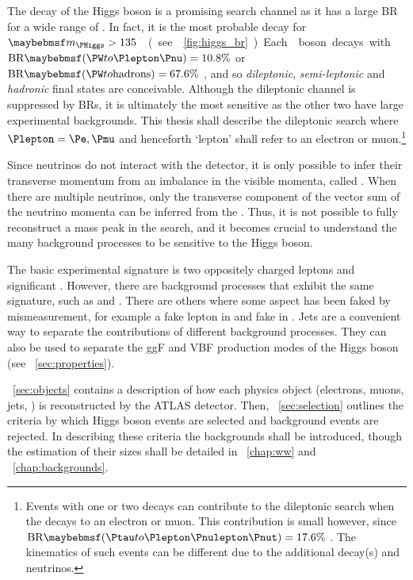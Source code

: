 
The \WW decay of the Higgs boson is a promising search channel as it has a large \ac{BR} 
for a wide range of \mH. In fact, it is the most probable decay for \unit{$\mH > 
135$}{\GeV} (see \Figure~\ref{fig:higgs_br}). Each \PW boson decays with 
$\text{BR}\parenths{\HepProcess{\PW\HepTo\Plepton\Pnu}} = 10.8\%$ 
or $\text{BR}\parenths{\HepProcess{\PW\HepTo \text{hadrons}}} = 67.6\%$ \cite{PDG:2012}, 
and so \textit{dileptonic}, \textit{semi-leptonic} and \textit{hadronic} final states are 
conceivable. Although the dileptonic channel is suppressed by \acp{BR}, it is ultimately 
the most sensitive as the other two have large experimental backgrounds. This thesis shall 
describe the dileptonic search \HWWlvlv where $\Plepton = \Pe, \Pmu$ and henceforth 
`lepton' shall refer to an electron or muon.\footnote{
	Events with one or two \HepProcess{\PW\HepTo\Ptau\Pnu} decays can 
	contribute to the dileptonic search when the \Ptau decays to an electron or muon. This 
	contribution is small however, since
	$\text{BR}\parenths{\HepProcess{\Ptau\HepTo\Plepton\Pnulepton\Pnut}} = 17.6\%$ 
	\cite{PDG:2012}. The kinematics of such events can be different due to the additional 
	decay(s) and neutrinos.
}

Since neutrinos do not interact with the detector, it is only possible to infer their 
transverse momentum from an imbalance in the visible momenta, called \met. When there are 
multiple neutrinos, only the transverse component of the vector sum of the neutrino 
momenta can be inferred from the \met. Thus, it is not possible to fully reconstruct a 
mass peak in the \HWWlvlv search, and it becomes crucial to understand the many background 
processes to be sensitive to the Higgs boson.

The basic experimental signature is two oppositely charged leptons and significant \met. 
However, there are background processes that exhibit the same signature, such as \WW and 
\ttbar. There are others where some aspect has been faked by mismeasurement, for example a 
fake lepton in \Wjets and fake \met in \Zjets. Jets are a convenient way to separate the 
contributions of different background processes. They can also be used to separate the 
\ac{ggF} and \ac{VBF} production modes of the Higgs boson (see 
\Section~\ref{sec:properties}).

\Section~\ref{sec:objects} contains a description of how each physics object (electrons, 
muons, jets, \met) is reconstructed by the ATLAS detector. Then, 
\Section~\ref{sec:selection} outlines the criteria by which Higgs boson events are 
selected and background events are rejected. In describing these criteria the backgrounds 
shall be introduced, though the estimation of their sizes shall be detailed in 
\Chapter~\ref{chap:ww} and \Chapter~\ref{chap:backgrounds}.

